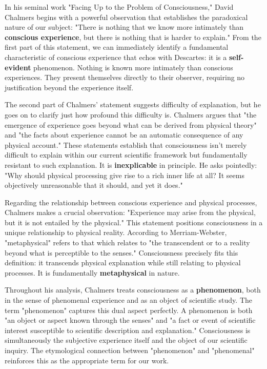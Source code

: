 \documentclass[runningheads]{llncs}
\begin{document}
In his seminal work "Facing Up to the Problem of Consciousness," David Chalmers begins with a powerful observation that establishes the paradoxical nature of our subject: "There is nothing that we know more intimately than \textbf{conscious experience}, but there is nothing that is harder to explain." From the first part of this statement, we can immediately identify a fundamental characteristic of conscious experience that echos with Descartes: it is a \textbf{self-evident} phenomenon. Nothing is known more intimately than conscious experiences. They present themselves directly to their observer, requiring no justification beyond the experience itself.

The second part of Chalmers' statement suggests difficulty of explanation, but he goes on to clarify just how profound this difficulty is. Chalmers argues that "the emergence of experience goes beyond what can be derived from physical theory" and "the facts about experience cannot be an automatic consequence of any physical account." These statements establish that consciousness isn't merely difficult to explain within our current scientific framework but fundamentally resistant to such explanation. It is \textbf{inexplicable} in principle. He asks pointedly: "Why should physical processing give rise to a rich inner life at all? It seems objectively unreasonable that it should, and yet it does."

Regarding the relationship between conscious experience and physical processes, Chalmers makes a crucial observation: "Experience may arise from the physical, but it is not entailed by the physical." This statement positions consciousness in a unique relationship to physical reality. According to Merriam-Webster, "metaphysical" refers to that which relates to "the transcendent or to a reality beyond what is perceptible to the senses." Consciousness precisely fits this definition: it transcends physical explanation while still relating to physical processes. It is fundamentally \textbf{metaphysical} in nature.

Throughout his analysis, Chalmers treats consciousness as a \textbf{phenomenon}, both in the sense of phenomenal experience and as an object of scientific study. The term "phenomenon" captures this dual aspect perfectly. A phenomenon is both "an object or aspect known through the senses" and "a fact or event of scientific interest susceptible to scientific description and explanation." Consciousness is simultaneously the subjective experience itself and the object of our scientific inquiry. The etymological connection between "phenomenon" and "phenomenal" reinforces this as the appropriate term for our work.
\end{document}
